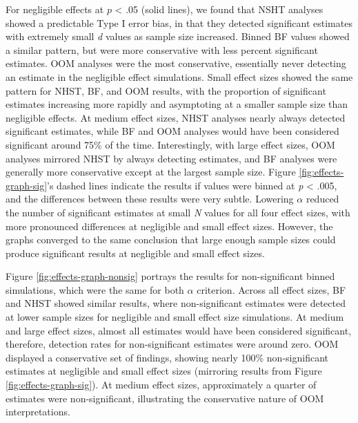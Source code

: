 \documentclass[,man, mask]{apa6}
\theoremstyle{definition}
\theoremstyle{definition}
\theoremstyle{definition}
\theoremstyle{remark}
\begin{document}
For negligible effects at \(p\) \textless{} .05 (solid lines), we found
that NSHT analyses showed a predictable Type I error bias, in that they
detected significant estimates with extremely small \emph{d} values as
sample size increased. Binned BF values showed a similar pattern, but
were more conservative with less percent significant estimates. OOM
analyses were the most conservative, essentially never detecting an
estimate in the negligible effect simulations. Small effect sizes showed
the same pattern for NHST, BF, and OOM results, with the proportion of
significant estimates increasing more rapidly and asymptoting at a
smaller sample size than negligible effects. At medium effect sizes,
NHST analyses nearly always detected significant estimates, while BF and
OOM analyses would have been considered significant around 75\% of the
time. Interestingly, with large effect sizes, OOM analyses mirrored NHST
by always detecting estimates, and BF analyses were generally more
conservative except at the largest sample size. Figure
\ref{fig:effects-graph-sig}'s dashed lines indicate the results if
values were binned at \emph{p} \textless{} .005, and the differences
between these results were very subtle. Lowering \(\alpha\) reduced the
number of significant estimates at small \emph{N} values for all four
effect sizes, with more pronounced differences at negligible and small
effect sizes. However, the graphs converged to the same conclusion that
large enough sample sizes could produce significant results at
negligible and small effect sizes.

Figure \ref{fig:effects-graph-nonsig} portrays the results for
non-significant binned simulations, which were the same for both
\(\alpha\) criterion. Across all effect sizes, BF and NHST showed
similar results, where non-significant estimates were detected at lower
sample sizes for negligible and small effect size simulations. At medium
and large effect sizes, almost all estimates would have been considered
significant, therefore, detection rates for non-significant estimates
were around zero. OOM displayed a conservative set of findings, showing
nearly 100\% non-significant estimates at negligible and small effect
sizes (mirroring results from Figure \ref{fig:effects-graph-sig}). At
medium effect sizes, approximately a quarter of estimates were
non-significant, illustrating the conservative nature of OOM
interpretations.
\end{document}
